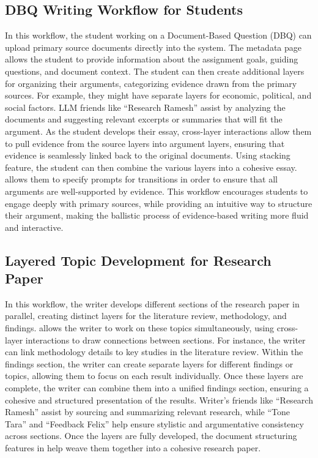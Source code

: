 \subsection{DBQ Writing Workflow for Students}
In this workflow, the student working on a Document-Based Question (DBQ) can upload primary source documents directly into the system. The metadata page allows the student to provide information about the assignment goals, guiding questions, and document context. The student can then create additional layers for organizing their arguments, categorizing evidence drawn from the primary sources. For example, they might have separate layers for economic, political, and social factors. LLM friends like ``Research Ramesh'' assist by analyzing the documents and suggesting relevant excerpts or summaries that will fit the argument. As the student develops their essay, cross-layer interactions allow them to pull evidence from the source layers into argument layers, ensuring that evidence is seamlessly linked back to the original documents. Using \systems stacking feature, the student can then combine the various layers into a cohesive essay. \system allows them to specify prompts for transitions in order to ensure that all arguments are well-supported by evidence. This workflow encourages students to engage deeply with primary sources, while providing an intuitive way to structure their argument, making the ballistic process of evidence-based writing more fluid and interactive.


\subsection{Layered Topic Development for Research Paper}

In this workflow, the writer develops different sections of the research paper in parallel, creating distinct layers for the literature review, methodology, and findings. \system allows the writer to work on these topics simultaneously, using cross-layer interactions to draw connections between sections. For instance, the writer can link methodology details to key studies in the literature review. Within the findings section, the writer can create separate layers for different findings or topics, allowing them to focus on each result individually. Once these layers are complete, the writer can combine them into a unified findings section, ensuring a cohesive and structured presentation of the results. Writer's friends like ``Research Ramesh'' assist by sourcing and summarizing relevant research, while ``Tone Tara'' and ``Feedback Felix'' help ensure stylistic and argumentative consistency across sections. Once the layers are fully developed, the document structuring features in \system help weave them together into a cohesive research paper.